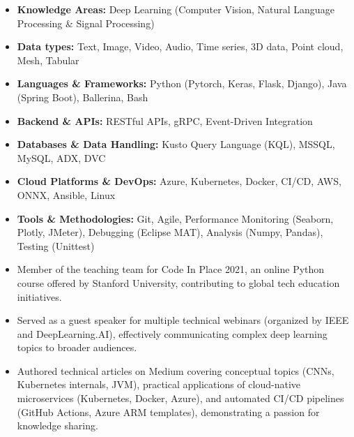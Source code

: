 \documentclass[12pt,a4paper,withhyper]{altacv}
\begin{document}
\begin{itemize}
    \item \textbf{Knowledge Areas:} Deep Learning (Computer Vision, Natural Language Processing \& Signal Processing)
    \item \textbf{Data types:} Text, Image, Video, Audio, Time series, 3D data, Point cloud, Mesh, Tabular
    \item \textbf{Languages \& Frameworks:} Python (Pytorch, Keras, Flask, Django), Java (Spring Boot), Ballerina, Bash
    \item \textbf{Backend \& APIs:} RESTful APIs, gRPC, Event-Driven Integration
    \item \textbf{Databases \& Data Handling:} Kusto Query Language (KQL), MSSQL, MySQL, ADX, DVC
    \item \textbf{Cloud Platforms \& DevOps:} Azure, Kubernetes, Docker, CI/CD, AWS, ONNX, Ansible, Linux
    \item \textbf{Tools \& Methodologies:} Git, Agile, Performance Monitoring (Seaborn, Plotly, JMeter), Debugging (Eclipse MAT), Analysis (Numpy, Pandas), Testing (Unittest)
\end{itemize}

\medskip

\begin{itemize}
    \item Member of the teaching team for Code In Place 2021, an online Python course offered by Stanford University, contributing to global tech education initiatives.
    \item Served as a guest speaker for multiple technical webinars (organized by IEEE and DeepLearning.AI), effectively communicating complex deep learning topics to broader audiences.
    \item  Authored technical articles on Medium covering conceptual topics (CNNs, Kubernetes internals, JVM), practical applications of cloud-native microservices (Kubernetes, Docker, Azure), and automated CI/CD pipelines (GitHub Actions, Azure ARM templates), demonstrating a passion for knowledge sharing.
\end{itemize}

\medskip
\end{document}
